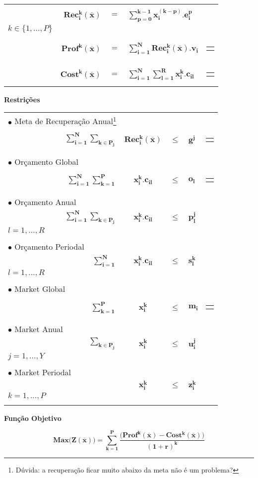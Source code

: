 \documentclass{article}
\newcommand{\topico}[1]{
  \vspace{20pt}
  {\Large \bf #1 }
}
\newenvironment{restricoes}
  { \begin{longtable}{lrccll}}
  {\end{longtable} }
\newcommand{\restricao}[6]{
    \multicolumn{2}{l}{ $\bullet$ #1} & & \\ \nopagebreak
    & ${ \displaystyle \bm{#2} }$
    & ${ \bm{#3} }$
    & ${ \bm{#4} }$
    & ${ \bm{#5} }$ &
    \begin{tabular}{l}
	  #6
    \end{tabular}
	\\ \hspace{30pt}
}
\newenvironment{equacoes}
	{ \begin{longtable}{lrcll} }
	{ \end{longtable} }
\newcommand{\equacao}[4]{
    \multicolumn{5}{l}{\text{ \parbox{250pt}{$\bullet$ #1} }} \\   %
    \phantom{aaaaaa} & $ \displaystyle \bm{#2} $                              %
    & $ = $                 
	& $\displaystyle \bm{#3} $                           %
	&
	\begin{tabular}{l}
	  #4                                 %
	\end{tabular}
	\vspace{12pt}
	\\
}
\begin{document}
\begin{equacoes}
    \equacao
	  {Recuperação de energia para o período $k$ causada pelas as ações $i$ de todos os períodos.}
	  {Rec_{i}^{k}(\overline{x})}
	  {\sum_{p = 0}^{k-1} x_i^{(k-p)} . e_i^{p}}
	  { $i \in \{1, \ldots, N\}$ \\ $k \in \{1, \ldots, P\}$ }
	\equacao
	  {Lucro originado pela energia recuperada no período $k$.}
	  {Prof^k(\overline{x})}
	  {\sum_{i=1}^N Rec_{i}^k(\overline{x}) . v_i}
	  { $k \in \{1, \ldots, P\}$}
	\equacao
	  {Custo total de todas as ações executadas no período $k$.}
	  {Cost^k(\overline{x})}
	  {\sum_{i=1}^N \sum_{l=1}^R x_i^k . c_{il}}
	  { $k \in \{1, \ldots, P\}$}
\end{equacoes}

\topico{Restrições}

\begin{restricoes}
    \restricao
	  {Meta de Recuperação Anual\footnote{Dúvida: a recuperação ficar muito abaixo da meta não é um problema?}}
	  { \sum_{i = 1}^N \sum_{k \in P_j}}
	  { Rec_i^k(\overline{x})}
	  { \leq }
	  { g^j }
	  { $ j = 1, \ldots, Y $ }
	\\
    \restricao
	  {Orçamento Global}
	  { \sum_{i = 1}^N \sum_{k = 1}^P }
	  { x_i^k . c_{il}}
	  { \leq }
	  { o_l }
	  { $ l = 1, \ldots, R $ }
	\\
    \restricao
      {Orçamento Anual}
      { \sum_{i = 1}^N \sum_{k \in P_j} }
      { x_i^k . c_{il} }
	  { \leq }
	  { p_l^j }
	  { $ j = 1, \ldots, Y $ \\ $ l = 1, \ldots, R$ }
    \\
	\restricao
	  {Orçamento Periodal}
      { \sum_{i = 1}^N }
      { x_i^k . c_{il} }
	  { \leq }
	  { s_l^{k} }
	  { $ k = 1, \ldots, P $ \\ $ l = 1, \ldots, R $ }
	\\
	\restricao
	  {Market Global}
      { \sum_{k = 1}^P }
      { x_i^k }
	  { \leq }
	  { m_i }
	  { $ i = 1, \ldots, N $ }
	\\
	\restricao
	  {Market Anual}
      { \sum_{k \in P_j} }
      { x_i^k }
	  { \leq }
	  { u_i^j }
	  { $ i = 1, \ldots, N $ \\ $ j = 1, \ldots, Y $ }
	\\
	\restricao
	  {Market Periodal}
      { }
      { x_i^k }
	  { \leq }
	  { z_i^k }
	  { $ i = 1, \ldots, N $ \\ $ k = 1, \ldots, P$ }
\end{restricoes}

\topico{Função Objetivo}
\begin{equation}
  \nonumber
    \bm{
	  Max \big(Z(\overline{x})\big) =
	    \sum_{k=1}^P
	    \frac
		  {\big( Prof^k(\overline{x}) - Cost^k(\overline{x}) \big)}
	      {(1+r)^k}
	}
  \label{eq:budget}
\end{equation}

\vfill
\end{document}
